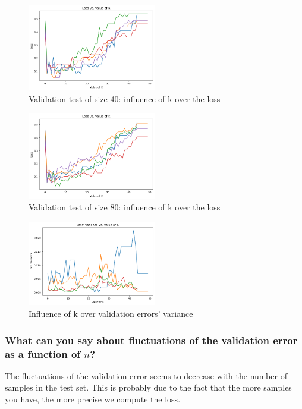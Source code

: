 \documentclass[a4paper,12pt]{article}
\begin{document}
\begin{figure}[htbp]
	\centering
	\includegraphics[width=0.5\textwidth]{3}
	\caption{Validation test of size 40: influence of k over the loss}
\end{figure}

\begin{figure}[htbp]
	\centering
	\includegraphics[width=0.5\textwidth]{4}
	\caption{Validation test of size 80: influence of k over the loss}
\end{figure}

\begin{figure}[htbp]
	\centering
	\includegraphics[width=0.5\textwidth]{5}
	\caption{Influence of k over validation errors' variance}
\end{figure}

\subsubsection{What can you say about fluctuations of the validation error as a
	function of $n$?}

The fluctuations of the validation error seems to decrease with the number of
samples in the test set. This is probably due to the fact that the more samples
you have, the more precise we compute the loss.
\end{document}
